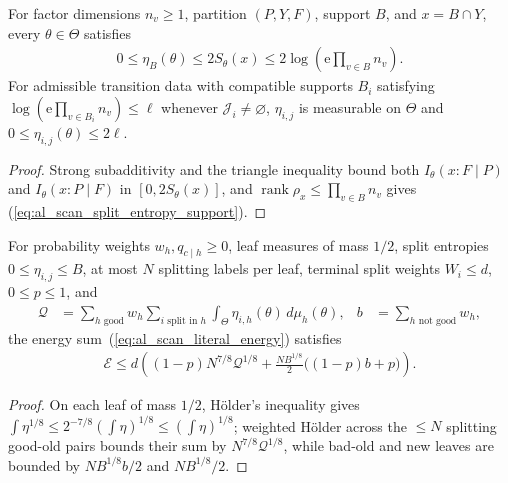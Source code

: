 \begin{lemma}
    \label{thm:al_scan_split_entropy_cap}
    \leanok
    For factor dimensions $n_v\ge1$, partition $(P,Y,F)$, support $B$, and
    $x=B\cap Y$, every $\theta\in\Theta$ satisfies
    \begin{align}
        0\le\eta_B(\theta)\le 2S_\theta(x)
        \le 2\log\left(\mathrm e\prod_{v\in B}n_v\right).
        \label{eq:al_scan_split_entropy_support}
    \end{align}
    For admissible transition data with compatible supports $B_i$ satisfying
    $\log(\mathrm e\prod_{v\in B_i}n_v)\le\ell$ whenever $\mathcal J_i\ne\varnothing$,
    $\eta_{i,j}$ is measurable on $\Theta$ and $0\le\eta_{i,j}(\theta)\le2\ell$.
\end{lemma}
\begin{proof}\leanok
    Strong subadditivity and the triangle inequality bound both
    $I_\theta(x:F\mid P)$ and $I_\theta(x:P\mid F)$ in $[0,2S_\theta(x)]$, and
    $\operatorname{rank}\rho_x\le\prod_{v\in B}n_v$ gives
    (\ref{eq:al_scan_split_entropy_support}).
\end{proof}

\begin{lemma}
    \label{thm:al_scan_finite_charge_energy}
    \leanok
    For probability weights $w_h,q_{c\mid h}\ge0$, leaf measures of mass $1/2$,
    split entropies $0\le\eta_{i,j}\le B$, at most $N$ splitting labels per
    leaf, terminal split weights $W_i\le d$, $0\le p\le1$, and
    \begin{align}
        \mathcal Q                          & =\sum_{h\text{ good}}w_h
        \sum_{i\text{ split in }h}\int_\Theta
        \eta_{i,h}(\theta)\,d\mu_h(\theta), &
        b                                   & =\sum_{h\text{ not good}}w_h,
        \label{eq:al_scan_finite_charge_defect}
    \end{align}
    the energy sum~(\ref{eq:al_scan_literal_energy}) satisfies
    \begin{align}
        \mathcal E\le d\left((1-p)N^{7/8}\mathcal Q^{1/8}
        +\frac{NB^{1/8}}2\bigl((1-p)b+p\bigr)\right).
        \label{eq:al_scan_finite_charge_energy}
    \end{align}
\end{lemma}
\begin{proof}\leanok
    On each leaf of mass $1/2$, H\"older's inequality gives
    $\int\eta^{1/8}\le 2^{-7/8}(\int\eta)^{1/8}\le(\int\eta)^{1/8}$; weighted
    H\"older across the $\le N$ splitting good-old pairs bounds their sum by
    $N^{7/8}\mathcal Q^{1/8}$, while bad-old and new leaves are bounded by
    $NB^{1/8}b/2$ and $NB^{1/8}/2$.
\end{proof}

